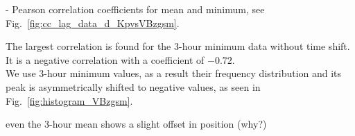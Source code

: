 \Kp{}-\vBz{} Pearson correlation coefficients for mean and minimum, see Fig.~\ref{fig:cc_lag_data_d_KpvsVBzgsm}.\\
\begin{figure}
\end{figure}
The largest correlation is found for the 3-hour minimum data without time shift. It is a negative correlation with a coefficient of $-0.72$.\\

We use \vBz{} 3-hour minimum values, as a result their frequency distribution and its peak is asymmetrically shifted to negative values, as seen in Fig.~\ref{fig:histogram_VBzgsm}.\\
\begin{figure}
\end{figure}
even the 3-hour mean shows a slight offset in position (why?)\\


